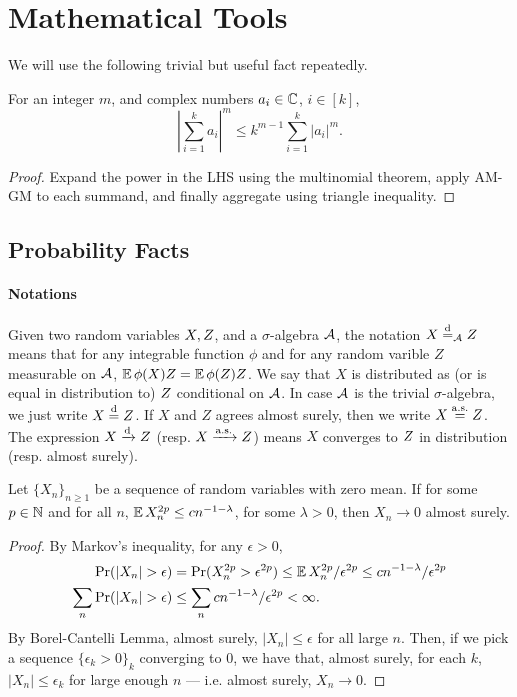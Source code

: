 \documentclass[main.tex]{subfiles}
\begin{document}
\section{Mathematical Tools}

\label{sec:proofs}

We will use the following trivial but useful fact repeatedly.

\begin{lemma}\label{lem:powerbound}
For an integer $m$, and complex numbers $a_i \in \mathbb{C}$, $i \in [k]$,
\[
\left| \sum_{i=1}^k a_i \right|^m
\le 
k^{m-1} \sum_{i=1}^k \left|a_i\right|^m
.
\]
\end{lemma}
\begin{proof}
Expand the power in the LHS using the multinomial theorem, apply AM-GM to each summand, and finally aggregate using triangle inequality.
\end{proof}

\subsection{Probability Facts}
\label{sec:probfacts}

\paragraph{Notations}
Given two random variables $X, Z$, and a $\sigma$-algebra $\mathcal{A}$, the notation $X \overset{\mathrm{d}}{=}_{\mathcal{A}} Z$ means that for any integrable function $\phi$ and for any random varible $Z$ measurable on $\mathcal{A}$, $\operatorname*{\mathbb{E}} \phi(X) Z = \operatorname*{\mathbb{E}} \phi(Z)Z$.
We say that $X$ is distributed as (or is equal in distribution to) $Z$ conditional on $\mathcal{A}$.
In case $\mathcal{A}$ is the trivial $\sigma$-algebra, we just write $X \overset{\mathrm{d}}{=} Z$.
If $X$ and $Z$ agrees almost surely, then we write $X \overset{\mathrm{a.s.}}{=} Z$.
The expression $X \xrightarrow{\mathrm{d}} Z$ (resp. $X \xrightarrow{\mathrm{a.s.}} Z$) means $X$ converges to $Z$ in distribution (resp. almost surely).

\begin{lemma}\label{lemma:momentBoundASConvergence}
Let $\{X_n\}_{n \ge 1}$ be a sequence of random variables with zero mean.
If for some $p \in \mathbb{N}$ and for all $n$, $\operatorname*{\mathbb{E}} X_n^{2p} \le c n^{-1-\lambda}$, for some $\lambda > 0$, then $X_n \to 0$ almost surely.
\end{lemma}
\begin{proof}
By Markov's inequality, for any $\epsilon > 0$,
\begin{align*}
    \Pr(|X_n| > \epsilon)
        &=
            \Pr(X_n^{2p} > \epsilon^{2p})
        \le
            \operatorname*{\mathbb{E}} X_n^{2p}/\epsilon^{2p}
        \le c n^{-1-\lambda}/\epsilon^{2p}
        \\
    \sum_n \Pr(|X_n| > \epsilon)
        &\le
            \sum_n c n^{-1-\lambda}/\epsilon^{2p}
        <    
            \infty.
\end{align*}
By Borel-Cantelli Lemma, almost surely, $|X_n| \le \epsilon$ for all large $n$.
Then, if we pick a sequence $\{\epsilon_k > 0\}_k$ converging to 0, we have that, almost surely, for each $k$, $|X_n| \le \epsilon_k$ for large enough $n$ --- i.e. almost surely, $X_n \to 0$.
\end{proof}
\end{document}
